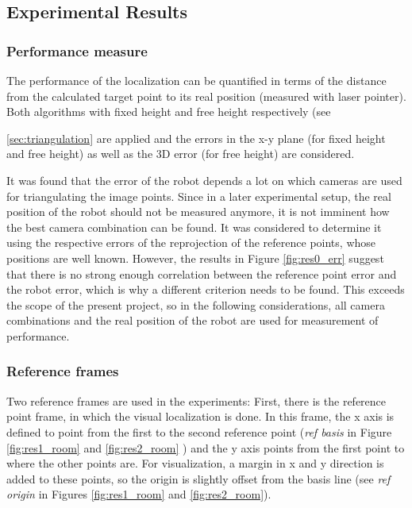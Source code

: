 \subsection{Experimental Results}

\subsubsection{Performance measure}
The performance of the localization can be quantified in terms of the distance from the calculated target point to its real position (measured with laser pointer). 
Both algorithms with fixed height and free height respectively (see \par \ref{sec:triangulation} are applied and the errors in the x-y plane (for fixed height and free height) as well as the 3D error (for free height) are considered. 

It was found that the error of the robot depends a lot on which cameras are used for triangulating the image points. 
Since in a later experimental setup, the real position of the robot should not be measured anymore, it is not imminent how the best camera combination can be found. 
It was considered to determine it using the respective errors of the reprojection of the reference points, whose positions are well known. 
However, the results in Figure \ref{fig:res0_err} suggest that there is no strong enough correlation between the reference point error and the robot error, which is why a different criterion needs to be found. 
This exceeds the scope of the present project, so in the following considerations, all camera combinations and the real position of the robot are used for measurement of performance. 

\subsubsection{Reference frames}
Two reference frames are used in the experiments: First, there is the reference point frame, in which the visual localization is done. 
In this frame, the x axis is defined to point from the first to the second reference point (\textit{ref basis} in Figure \ref{fig:res1_room} and \ref{fig:res2_room} ) and the y axis points from the first point to where the other points are.
For visualization, a margin in x and y direction is added to these points, so the origin is slightly offset from the basis line (see \textit{ref origin} in Figures \ref{fig:res1_room} and \ref{fig:res2_room}).

